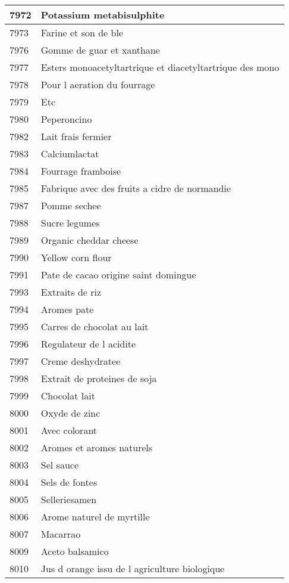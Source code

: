 \begin{longtable}{|l|l|}
7972 & Potassium metabisulphite \\ \hline 
7973 & Farine et son de ble \\ \hline 
7976 & Gomme de guar et xanthane \\ \hline 
7977 & Esters monoacetyltartrique et diacetyltartrique des mono \\ \hline 
7978 & Pour l aeration du fourrage \\ \hline 
7979 & Etc \\ \hline 
7980 & Peperoncino \\ \hline 
7982 & Lait frais fermier \\ \hline 
7983 & Calciumlactat \\ \hline 
7984 & Fourrage framboise \\ \hline 
7985 & Fabrique avec des fruits a cidre de normandie \\ \hline 
7987 & Pomme sechee \\ \hline 
7988 & Sucre legumes \\ \hline 
7989 & Organic cheddar cheese \\ \hline 
7990 & Yellow corn flour \\ \hline 
7991 & Pate de cacao origine saint domingue \\ \hline 
7993 & Extraits de riz \\ \hline 
7994 & Aromes pate \\ \hline 
7995 & Carres de chocolat au lait \\ \hline 
7996 & Regulateur de l acidite \\ \hline 
7997 & Creme deshydratee \\ \hline 
7998 & Extrait de proteines de soja \\ \hline 
7999 & Chocolat lait \\ \hline 
8000 & Oxyde de zinc \\ \hline 
8001 & Avec colorant \\ \hline 
8002 & Aromes et aromes naturels \\ \hline 
8003 & Sel sauce \\ \hline 
8004 & Sels de fontes \\ \hline 
8005 & Selleriesamen \\ \hline 
8006 & Arome naturel de myrtille \\ \hline 
8007 & Macarrao \\ \hline 
8009 & Aceto balsamico \\ \hline 
8010 & Jus d orange issu de l agriculture biologique \\ \hline 

\end{longtable}
